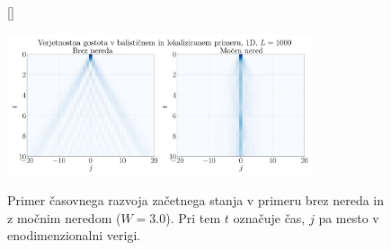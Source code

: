 \documentclass[10pt,a4paper]{article}
\begin{document}
\begin{figure}[H]
[\FBwidth]
{\caption{Primer časovnega razvoja začetnega stanja v primeru brez nereda in z močnim neredom ($W=3.0$). Pri tem $t$ označuje čas, $j$ pa mesto v enodimenzionalni verigi. }\label{fig:light_cone}}
{\includegraphics[width=0.8\textwidth]{1D_Anderson_localization_Seminar_scaling_analysis_D1_shape_1000_light_cone_double_presentation.pdf}}
\end{figure} 
\end{document}

